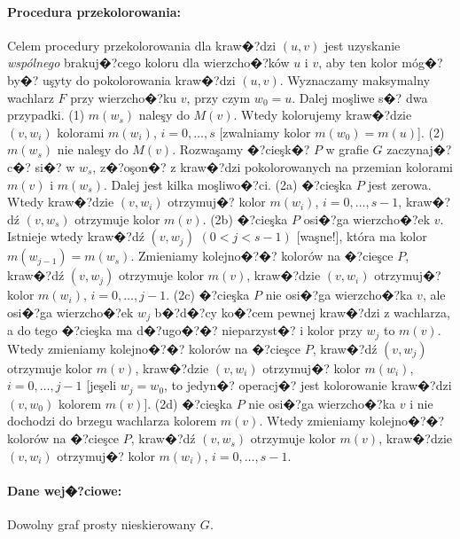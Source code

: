 \documentclass[12pt,a4paper]{mwrep}
\begin{document}
\paragraph{Procedura przekolorowania:} Celem procedury przekolorowania 
dla kraw�?dzi $(u,v)$ jest uzyskanie \emph{wspólnego} brakuj�?cego koloru
dla wierzcho�?ków $u$ i $v$, aby ten kolor móg�? by�? uşyty
do pokolorowania kraw�?dzi $(u,v)$.
Wyznaczamy maksymalny wachlarz $F$ przy wierzcho�?ku $v$,
przy czym $w_0 = u$.
Dalej moşliwe s�? dwa przypadki.
\newline
(1) $m(w_s)$ naleşy do $M(v)$. Wtedy kolorujemy kraw�?dzie $(v,w_i)$
kolorami $m(w_i)$, $i=0, \ldots, s$ [zwalniamy kolor $m(w_0)=m(u)$].
\newline
(2) $m(w_s)$ nie naleşy do $M(v)$.
Rozwaşamy �?cieşk�? $P$ w grafie $G$ zaczynaj�?c�? si�? w $w_s$,
z�?oşon�? z kraw�?dzi pokolorowanych na przemian kolorami $m(v)$ i $m(w_s)$.
Dalej jest kilka moşliwo�?ci.
\newline
(2a) �?cieşka $P$ jest zerowa.
Wtedy kraw�?dzie $(v,w_i)$ otrzymuj�? kolor $m(w_i)$, $i=0,\ldots,s-1$,
kraw�?dź $(v,w_s)$ otrzymuje kolor $m(v)$.
\newline
(2b) �?cieşka $P$ osi�?ga wierzcho�?ek $v$.
Istnieje wtedy kraw�?dź $(v,w_j)$ $(0 < j < s-1)$ [waşne!],
która ma kolor $m(w_{j-1})=m(w_s)$.
Zmieniamy kolejno�?�? kolorów na �?cieşce $P$,
kraw�?dź $(v,w_j)$ otrzymuje kolor $m(v)$,
kraw�?dzie $(v,w_i)$ otrzymuj�? kolor $m(w_i)$, $i=0,\ldots,j-1$.
\newline
(2c) �?cieşka $P$ nie osi�?ga wierzcho�?ka $v$,
ale osi�?ga wierzcho�?ek $w_j$ b�?d�?cy ko�?cem pewnej kraw�?dzi z wachlarza,
a do tego �?cieşka ma d�?ugo�?�? nieparzyst�? i kolor przy $w_j$ to $m(v)$.
Wtedy zmieniamy kolejno�?�? kolorów na �?cieşce $P$,
kraw�?dź $(v,w_j)$ otrzymuje kolor $m(v)$,
kraw�?dzie $(v,w_i)$ otrzymuj�? kolor $m(w_i)$, $i=0,\ldots,j-1$
[jeşeli $w_j=w_0$, to jedyn�? operacj�? jest kolorowanie kraw�?dzi
$(v,w_0)$ kolorem $m(v)$].
\newline
(2d) �?cieşka $P$ nie osi�?ga wierzcho�?ka $v$ i nie dochodzi
do brzegu wachlarza kolorem $m(v)$.
Wtedy zmieniamy kolejno�?�? kolorów na �?cieşce $P$,
kraw�?dź $(v,w_s)$ otrzymuje kolor $m(v)$,
kraw�?dzie $(v,w_i)$ otrzymuj�? kolor $m(w_i)$, $i=0,\ldots,s-1$.

\paragraph{Dane wej�?ciowe:} Dowolny graf prosty nieskierowany $G$.
\end{document}
